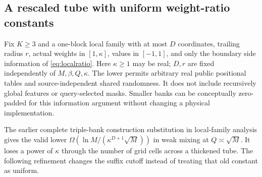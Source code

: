 \documentclass[11pt,letterpaper]{article}
\theoremstyle{definition}\newtheorem{definition}[theorem]{Definition}
\theoremstyle{remark}\newtheorem{remark}[theorem]{Remark}
\begin{document}
\subsection{A rescaled tube with uniform weight-ratio constants}
Fix $K\ge3$ and a one-block local family with at most $D$ coordinates, trailing radius $r$, actual weights in $[1,\kappa]$, values in $[-1,1]$, and only the boundary side information of \eqref{eq:localratio}. Here $\kappa\ge1$ may be real; $D,r$ are fixed independently of $M,\beta,Q,\kappa$. The lower permits arbitrary real public positional tables and source-independent shared randomness. It does not include recursively global features or query-selected masks. Smaller banks can be conceptually zero-padded for this information argument without changing a physical implementation.

The earlier complete triple-bank construction substitution in local-family analysis gives the valid lower $\Omega(\ln M/(\kappa^{D+1}\sqrt M))$ in weak mixing at $Q\asymp\sqrt M$. It loses a power of $\kappa$ through the number of grid cells across a thickened tube. The following refinement changes the suffix cutoff instead of treating that old constant as uniform.
\end{document}
